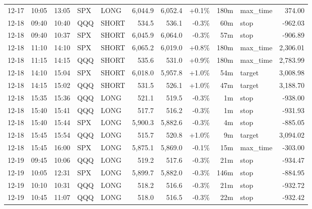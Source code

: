 \documentclass[11pt,a4paper,twoside]{article}
\begin{document}
\begin{center}
\begin{longtable}{>{\color{txtmain}}l l l l l r r r r >{\color{txtmain}}l r}
12-17 & 10:05 & 13:05 & SPX & LONG & 6,044.9 & 6,052.4 & \textcolor{wingreen}{+0.1\%} & 180m & max\_time & \textcolor{wingreen}{374.00} \\
12-18 & 09:40 & 10:40 & QQQ & SHORT & 534.5 & 536.1 & \textcolor{lossred}{-0.3\%} & 60m & stop & \textcolor{lossred}{-962.03} \\
12-18 & 09:40 & 10:37 & SPX & SHORT & 6,045.9 & 6,064.0 & \textcolor{lossred}{-0.3\%} & 57m & stop & \textcolor{lossred}{-906.89} \\
12-18 & 11:10 & 14:10 & SPX & SHORT & 6,065.2 & 6,019.0 & \textcolor{wingreen}{+0.8\%} & 180m & max\_time & \textcolor{wingreen}{2,306.01} \\
12-18 & 11:15 & 14:15 & QQQ & SHORT & 535.6 & 531.0 & \textcolor{wingreen}{+0.9\%} & 180m & max\_time & \textcolor{wingreen}{2,783.99} \\
12-18 & 14:10 & 15:04 & SPX & SHORT & 6,018.0 & 5,957.8 & \textcolor{wingreen}{+1.0\%} & 54m & target & \textcolor{wingreen}{3,008.98} \\
12-18 & 14:15 & 15:02 & QQQ & SHORT & 531.5 & 526.1 & \textcolor{wingreen}{+1.0\%} & 47m & target & \textcolor{wingreen}{3,188.70} \\
12-18 & 15:35 & 15:36 & QQQ & LONG & 521.1 & 519.5 & \textcolor{lossred}{-0.3\%} & 1m & stop & \textcolor{lossred}{-938.00} \\
12-18 & 15:40 & 15:41 & QQQ & LONG & 517.7 & 516.2 & \textcolor{lossred}{-0.3\%} & 1m & stop & \textcolor{lossred}{-931.93} \\
12-18 & 15:40 & 15:44 & SPX & LONG & 5,900.3 & 5,882.6 & \textcolor{lossred}{-0.3\%} & 4m & stop & \textcolor{lossred}{-885.05} \\
12-18 & 15:45 & 15:54 & QQQ & LONG & 515.7 & 520.8 & \textcolor{wingreen}{+1.0\%} & 9m & target & \textcolor{wingreen}{3,094.02} \\
12-18 & 15:45 & 16:00 & SPX & LONG & 5,875.1 & 5,869.0 & \textcolor{lossred}{-0.1\%} & 15m & max\_time & \textcolor{lossred}{-303.00} \\
12-19 & 09:45 & 10:06 & QQQ & LONG & 519.2 & 517.6 & \textcolor{lossred}{-0.3\%} & 21m & stop & \textcolor{lossred}{-934.47} \\
12-19 & 10:05 & 12:31 & SPX & LONG & 5,899.7 & 5,882.0 & \textcolor{lossred}{-0.3\%} & 146m & stop & \textcolor{lossred}{-884.95} \\
12-19 & 10:10 & 10:31 & QQQ & LONG & 518.2 & 516.6 & \textcolor{lossred}{-0.3\%} & 21m & stop & \textcolor{lossred}{-932.72} \\
12-19 & 10:45 & 11:07 & QQQ & LONG & 518.0 & 516.5 & \textcolor{lossred}{-0.3\%} & 22m & stop & \textcolor{lossred}{-932.42} \\

\end{longtable}
\end{center}
\end{document}
